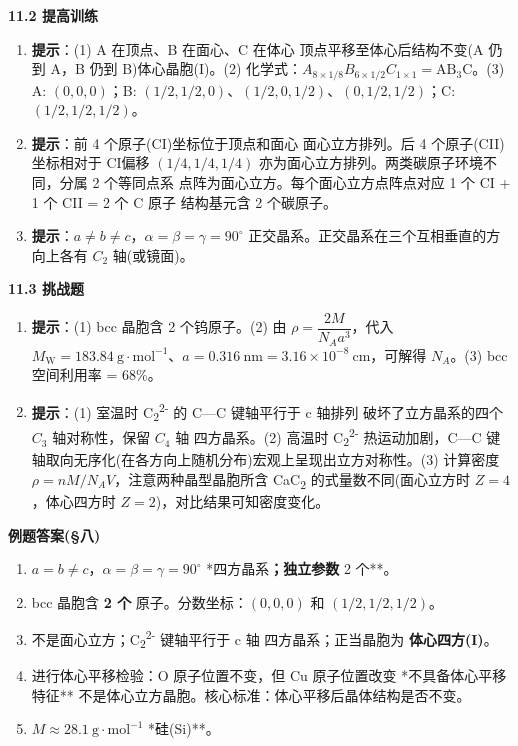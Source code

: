 \textbf{11.2 提高训练}

\begin{enumerate}
\def\labelenumi{\arabic{enumi}.}
\setcounter{enumi}{3}
\item
  \textbf{提示}：(1) A 在顶点、B 在面心、C 在体心 \箭 顶点平移至体心后结构不变(A 仍到 A，B 仍到 B)\箭 体心晶胞(I)。(2) 化学式：\(A_{8\times 1/8} B_{6\times 1/2} C_{1\times 1} = \mathrm{AB_3C}\)。(3) A: \((0,0,0)\)；B: \((1/2,1/2,0)\)、\((1/2,0,1/2)\)、\((0,1/2,1/2)\)；C: \((1/2,1/2,1/2)\)。
\item
  \textbf{提示}：前 4 个原子(CI)坐标位于顶点和面心 \箭 面心立方排列。后 4 个原子(CII)坐标相对于 CI偏移 \((1/4, 1/4, 1/4)\) \箭 亦为面心立方排列。两类碳原子环境不同，分属 2 个等同点系 \箭 点阵为面心立方。每个面心立方点阵点对应 1 个 CI + 1 个 CII = 2 个 C 原子 \箭 结构基元含 2 个碳原子。
\item
  \textbf{提示}：\(a \neq b \neq c\)，\(\alpha = \beta = \gamma = 90^\circ\) \箭 正交晶系。正交晶系在三个互相垂直的方向上各有 \(C_2\) 轴(或镜面)。
\end{enumerate}

\textbf{11.3 挑战题}

\begin{enumerate}
\def\labelenumi{\arabic{enumi}.}
\setcounter{enumi}{6}
\item
  \textbf{提示}：(1) bcc 晶胞含 2 个钨原子。(2) 由 \(\rho = \dfrac{2M}{N_A a^3}\)，代入 \(M_{\mathrm{W}} = 183.84\ \mathrm{g\cdot mol^{-1}}\)、\(a = 0.316\ \mathrm{nm} = 3.16\times 10^{-8}\ \mathrm{cm}\)，可解得 \(N_A\)。(3) bcc 空间利用率 = 68\%。
\item
  \textbf{提示}：(1) 室温时 C\textsubscript{2}\textsuperscript{2-} 的 C---C 键轴平行于 c 轴排列 \箭 破坏了立方晶系的四个 \(C_3\) 轴对称性，保留 \(C_4\) 轴 \箭 四方晶系。(2) 高温时 C\textsubscript{2}\textsuperscript{2-} 热运动加剧，C---C 键轴取向无序化(在各方向上随机分布)\箭 宏观上呈现出立方对称性。(3) 计算密度 \(\rho = nM/N_A V\)，注意两种晶型晶胞所含 CaC\textsubscript{2} 的式量数不同(面心立方时 \(Z = 4\)，体心四方时 \(Z = 2\))，对比结果可知密度变化。
\end{enumerate}

\textbf{例题答案(§八)}

\begin{enumerate}
\def\labelenumi{\arabic{enumi}.}
\item
  \(a = b \neq c\)，\(\alpha = \beta = \gamma = 90^\circ\) \箭 **四方晶系\textbf{；独立参数 }2 个**。
\item
  bcc 晶胞含 \textbf{2 个} 原子。分数坐标：\((0, 0, 0)\) 和 \((1/2, 1/2, 1/2)\)。
\item
  不是面心立方；C\textsubscript{2}\textsuperscript{2-} 键轴平行于 c 轴 \箭 四方晶系；正当晶胞为 \textbf{体心四方(I)}。
\item
  进行体心平移检验：O 原子位置不变，但 Cu 原子位置改变 \箭 **不具备体心平移特征** \箭 不是体心立方晶胞。核心标准：体心平移后晶体结构是否不变。
\item
  \(M \approx 28.1\ \mathrm{g\cdot mol^{-1}}\) \箭 **硅(Si)**。
\end{enumerate}

